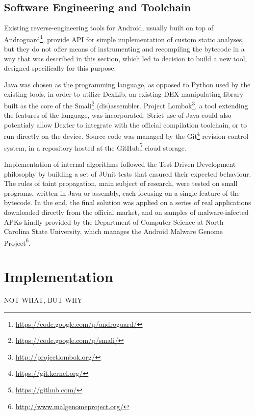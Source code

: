 \documentclass[12pt,twoside,notitlepage]{report}
\begin{document}
\section{Software Engineering and Toolchain}

Existing reverse-engineering tools for Android, usually built on top of Androguard\footnote{\scriptsize\url{https://code.google.com/p/androguard/}}, provide API for simple implementation of custom static analyses, but they do not offer means of instrumenting and recompiling the bytecode in a way that was described in this section, which led to decision to build a new tool, designed specifically for this purpose.

Java was chosen as the programming language, as opposed to Python used by the existing tools, in order to utilize DexLib, an existing DEX-manipulating library built as the core of the Smali\footnote{\scriptsize\url{https://code.google.com/p/smali/}} (dis)assembler. Project Lombok\footnote{\scriptsize\url{http://projectlombok.org/}}, a tool extending the features of the language, was incorporated. Strict use of Java could also potentialy allow Dexter to integrate with the official compilation toolchain, or to run directly on the device. Source code was managed by the Git\footnote{\scriptsize\url{https://git.kernel.org/}} revision control system, in a repository hosted at the GitHub\footnote{\scriptsize\url{https://github.com/}} cloud storage.

Implementation of internal algorithms followed the Test-Driven Development philosophy by building a set of JUnit tests that ensured their expected behaviour. The rules of taint propagation, main subject of research, were tested on small programs, written in Java or assembly, each focusing on a single feature of the bytecode. In the end, the final solution was applied on a series of real applications downloaded directly from the official market, and on samples of malware-infected APKs kindly provided by the Department of Computer Science at North Carolina State University, which manages the Android Malware Genome Project\footnote{\scriptsize\url{http://www.malgenomeproject.org/}}.

\cleardoublepage
\chapter{Implementation}

NOT WHAT, BUT WHY
\end{document}
